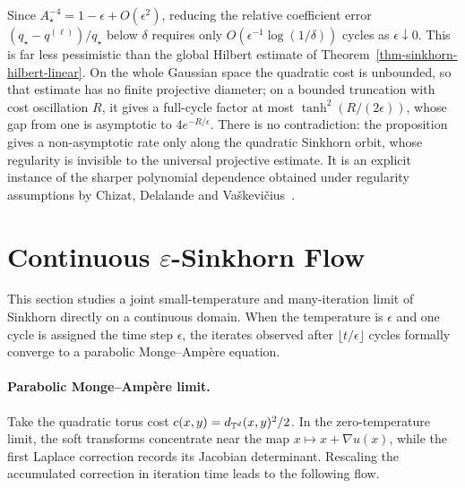 Since $A_\star^{-4}=1-\epsilon+O(\epsilon^2)$, reducing the relative coefficient error $(q_\star-q^{(\ell)})/q_\star$ below $\delta$ requires only $O(\epsilon^{-1}\log(1/\delta))$ cycles as $\epsilon\downarrow0$. This is far less pessimistic than the global Hilbert estimate of Theorem~\ref{thm-sinkhorn-hilbert-linear}. On the whole Gaussian space the quadratic cost is unbounded, so that estimate has no finite projective diameter; on a bounded truncation with cost oscillation $R$, it gives a full-cycle factor at most $\tanh^2(R/(2\epsilon))$, whose gap from one is asymptotic to $4e^{-R/\epsilon}$. There is no contradiction: the proposition gives a non-asymptotic rate only along the quadratic Sinkhorn orbit, whose regularity is invisible to the universal projective estimate. It is an explicit instance of the sharper polynomial dependence obtained under regularity assumptions by Chizat, Delalande and Va\v{s}kevi\v{c}ius~\cite{chizat2024sharper}.



\section{Continuous \texorpdfstring{$\varepsilon$}{epsilon}-Sinkhorn Flow}\label{sec-continuous-epsilon-sinkhorn}

This section studies a joint small-temperature and many-iteration limit of Sinkhorn directly on a continuous domain. When the temperature is $\epsilon$ and one cycle is assigned the time step $\epsilon$, the iterates observed after $\lfloor t/\epsilon\rfloor$ cycles formally converge to a parabolic Monge--Amp\`ere equation.

\paragraph{Parabolic Monge--Amp\`ere limit.}

Take the quadratic torus cost $c(x,y)=d_{\mathbb{T}^d}(x,y)^2/2$. In the zero-temperature limit, the soft transforms concentrate near the map $x\mapsto x+\nabla u(x)$, while the first Laplace correction records its Jacobian determinant. Rescaling the accumulated correction in iteration time leads to the following flow.

